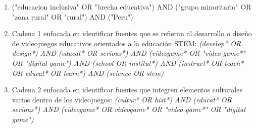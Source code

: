 \begin{enumerate}
    \item ("educacion inclusiva" OR "brecha educativa") AND ("grupo minoritario" OR "zona rural" OR "rural") AND ("Peru")
    \item Cadena 1 enfocada en identificar fuentes que se refieran al desarrollo o diseño de videojuegos educativos orientados a la educación STEM: \textit{(develop* OR design*) AND (educat* OR serious*) AND (videogame* OR "video game*" OR "digital game") AND (school OR institut*) AND (instruct* OR teach* OR educat* OR learn*) AND (science OR stem)}
    \item Cadena 2 enfocada en identificar fuentes que integren elementos culturales varios dentro de los videojuegos: \textit{(cultur* OR hist*) AND (educat* OR serious*) AND (videogame* OR videogame* OR "video game*" OR "digital game")}

\end{enumerate}
